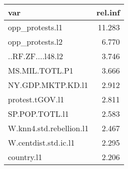 \begin{tabular}{lr}
  \hline
var & rel.inf \\ 
  \hline
opp\_protests.l1 & 11.283 \\ 
  opp\_protests.l2 & 6.770 \\ 
  ..RF.ZF....l48.l2 & 3.746 \\ 
  MS.MIL.TOTL.P1 & 3.666 \\ 
  NY.GDP.MKTP.KD.l1 & 2.912 \\ 
  protest.tGOV.l1 & 2.811 \\ 
  SP.POP.TOTL.l1 & 2.583 \\ 
  W.knn4.std.rebellion.l1 & 2.467 \\ 
  W.centdist.std.ic.l1 & 2.295 \\ 
  country.l1 & 2.206 \\ 
   \hline
\end{tabular}
